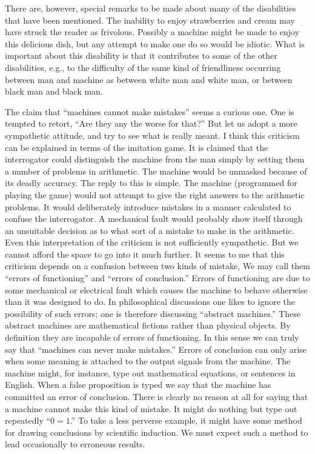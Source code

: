 \documentclass[10pt,twoside,openright]{memoir}
\begin{document}
There are, however, special remarks to be made about many of the disabilities that have been mentioned. The inability to enjoy strawberries and cream may have struck the reader as frivolous. Possibly a machine might be made to enjoy this delicious dish, but any attempt to make one do so would be idiotic. What is important about this disability is that it contributes to some of the other disabilities, e.g., to the difficulty of the same kind of friendliness occurring between man and machine as between white man and white man, or between black man and black man.

The claim that ``machines cannot make mistakes'' seems a curious one. One is tempted to retort, ``Are they any the worse for that?'' But let us adopt a more sympathetic attitude, and try to see what is really meant. I think this criticism can be explained in terms of the imitation game. It is claimed that the interrogator could distinguish the machine from the man simply by setting them a number of problems in arithmetic. The machine would be unmasked because of its deadly accuracy. The reply to this is simple. The machine (programmed for playing the game) would not attempt to give the right answers to the arithmetic problems. It would deliberately introduce mistakes in a manner calculated to confuse the interrogator. A mechanical fault would probably show itself through an unsuitable decision as to what sort of a mistake to make in the arithmetic. Even this interpretation of the criticism is not sufficiently sympathetic. But we cannot afford the space to go into it much further. It seems to me that this criticism depends on a confusion between two kinds of mistake, We may call them ``errors of functioning'' and ``errors of conclusion.'' Errors of functioning are due to some mechanical or electrical fault which causes the machine to behave otherwise than it was designed to do. In philosophical discussions one likes to ignore the possibility of such errors; one is therefore discussing ``abstract machines.'' These abstract machines are mathematical fictions rather than physical objects. By definition they are incapable of errors of functioning. In this sense we can truly say that ``machines can never make mistakes.'' Errors of conclusion can only arise when some meaning is attached to the output signals from the machine. The machine might, for instance, type out mathematical equations, or sentences in English. When a false proposition is typed we say that the machine has committed an error of conclusion. There is clearly no reason at all for saying that a machine cannot make this kind of mistake. It might do nothing but type out repeatedly ``$0 = 1$.'' To take a less perverse example, it might have some method for drawing conclusions by scientific induction. We must expect such a method to lead occasionally to erroneous results.
\end{document}
